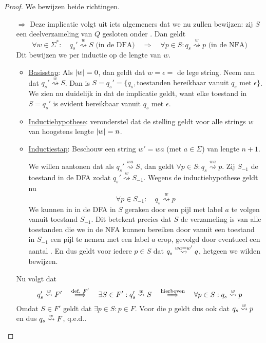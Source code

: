 \documentclass[../aanvullingen_cursus.tex]{subfiles}
\begin{document}
\begin{proof}
	We bewijzen beide richtingen.
	\begin{enumerate}
		\item[\( \Rightarrow \)] Deze implicatie volgt uit iets algemeners dat we nu zullen bewijzen: zij \(S\) een deelverzameling van \( Q \) gesloten onder \epsilonbogen. Dan geldt \[ \forall w \in \Sigma^*: \quad q_{s}' \overset{w}{\rightsquigarrow} S \text{ (in de DFA)} \quad \Longrightarrow \quad \forall p \in S: q_s \overset{w}{\rightsquigarrow} p \text{ (in de NFA)}  \] Dit bewijzen we per inductie op de lengte van \( w \).
		\begin{itemize}
			\item \underline{Basisstap}: Als \(\lvert w \rvert=0\), dan geldt dat \(w = \epsilon = \) de lege string. Neem aan dat \(q_{s}' \overset{w}{\rightsquigarrow} S\). Dan is \(S=q_s'=\{q_s, \text{toestanden bereikbaar vanuit }q_s \text{ met }\epsilon\}\). We zien nu duidelijk in dat de implicatie geldt, want elke toestand in \(S=q_s'\) is evident bereikbaar vanuit \(q_s\) met \(\epsilon\).
			\item \underline{Inductiehypothese}: veronderstel dat de stelling geldt voor alle strings \(w\) van hoogstens lengte \(\lvert w \rvert=n\).
			\item \underline{Inductiestap}: Beschouw een string \(w' = wa \) (met \(a \in \Sigma\)) van lengte \(n+1\).

			We willen aantonen dat als \(q_{s}' \overset{wa}{\rightsquigarrow} S\), dan geldt \(\forall p \in S: q_s \overset{wa}{\rightsquigarrow} p\). Zij \(S_{-1}\) de toestand in de DFA zodat \(q_{s}' \overset{w}{\rightsquigarrow} S_{-1}\). Wegens de inductiehypothese geldt nu \[ \forall p\in S_{-1}: \quad q_s \overset{w}{\rightsquigarrow} p\]We kunnen in in de DFA in \(S\) geraken door een pijl met label \(a\) te volgen vanuit toestand \(S_{-1}\). Dit betekent precies dat \(S\) de verzameling is van alle toestanden die we in de NFA kunnen bereiken door vanuit een toestand in \(S_{-1}\) een pijl te nemen met een label \(a\) erop, gevolgd door eventueel een aantal \epsilonbogen. En dus geldt voor iedere \(p \in S\) dat \(q_s \overset{wa=w'}{\rightsquigarrow} q \), hetgeen we wilden bewijzen.
		\end{itemize}

		Nu volgt dat \[q_s'\overset{w}{\rightsquigarrow}F' \quad \overset{\text{def. }F'}{\Longrightarrow} \quad \exists S \in F': q_s' \overset{w}{\rightsquigarrow} S \quad \overset{\text{hierboven}}{\Longrightarrow} \quad \forall p \in S: q_s \overset{w}{\rightsquigarrow} p\]
		Omdat \(S\in F'\) geldt dat \(\exists p \in S : p \in F\). Voor die \(p\) geldt dus ook dat \(q_s \overset{w}{\rightsquigarrow} p\) en dus \(q_s \overset{w}{\rightsquigarrow} F\), q.e.d..


\end{enumerate}
\end{proof}
\end{document}
